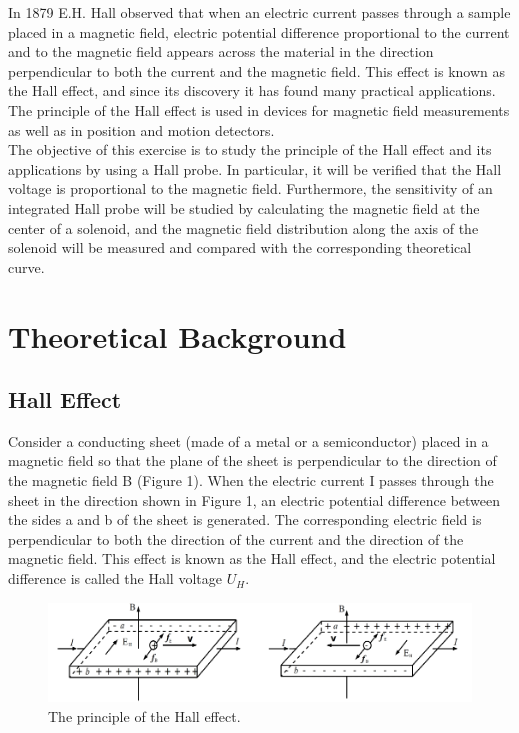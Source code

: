 \documentclass{article}
\begin{document}
In 1879 E.H. Hall observed that when an electric current passes through a sample placed in a magnetic field, electric potential difference proportional to the current and to the magnetic field appears across the material in the direction perpendicular to both the current and the magnetic field. This effect is known as the Hall effect, and since its discovery it has found many practical applications. The principle of the Hall effect is used in devices for magnetic field measurements as well as in position and motion detectors.\\

The objective of this exercise is to study the principle of the Hall effect and its applications by  using a Hall probe.  In particular, it will be verified that the Hall voltage is proportional to the magnetic field. Furthermore, the sensitivity of an integrated Hall probe will be studied by calculating the magnetic field at the center of a solenoid, and the magnetic field distribution along the axis of the solenoid will be measured and compared with the corresponding theoretical curve.

\section{Theoretical Background}

\subsection{Hall Effect}

Consider a conducting sheet (made of a metal or a semiconductor) placed in a magnetic   field so that the plane of the sheet is perpendicular to the direction of the magnetic field B (Figure 1).  When the electric current I passes through the sheet in the direction shown in Figure 1, an electric potential difference between the sides a and b of the sheet is generated. The corresponding electric field is perpendicular to both the direction of the current and the direction of the magnetic field. This effect is known as the Hall effect, and the electric potential difference is called the Hall voltage $U_H$.

\begin{figure}[H]
	\centering
	\includegraphics[scale=0.6]{p1.png}
	\caption{The principle of the Hall effect.}
\end{figure}
\end{document}

